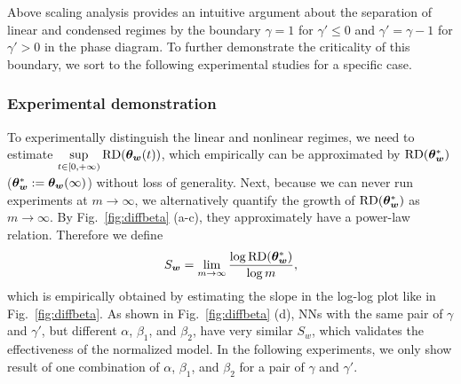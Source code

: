 \documentclass{article}
\begin{document}
Above scaling analysis provides an intuitive argument about the separation of linear and condensed regimes by the boundary $\gamma=1$ for $\gamma'\leq0$ and $\gamma'=\gamma-1$ for $\gamma'>0$ in the phase diagram. To further demonstrate the criticality of this boundary, we sort to the following experimental studies for a specific case.

\subsubsection{Experimental demonstration}
To experimentally distinguish the linear and nonlinear regimes, we need to estimate $\sup\limits_{t\in[0,+\infty)}\mathrm{RD}(\bm{\theta}_{\bm{w}}(t))$, which empirically can be approximated by $\mathrm{RD}(\bm{\theta}_{\bm{w}}^*)$ ($\bm{\theta}_{\bm{w}}^*:=\bm{\theta}_{\bm{w}}(\infty)$) without loss of generality. Next, because we can never run experiments at $m\to\infty$, we alternatively quantify the growth of $\mathrm{RD}(\bm{\theta}^*_{\bm{w}})$ as $m\to\infty$. By Fig.~\ref{fig:diffbeta} (a-c), they approximately have a power-law relation. Therefore we define
\begin{equation}
    S_{\bm{w}}=\lim_{m\to\infty}\frac{\log \mathrm{RD}(\bm{\theta}^*_{\bm{w}})}{\log m},
\end{equation}
which is empirically obtained by estimating the slope in the log-log plot like in Fig.~\ref{fig:diffbeta}. As shown in Fig.~\ref{fig:diffbeta} (d), NNs with the same pair of $\gamma$ and $\gamma'$, but different $\alpha$, $\beta_1$, and $\beta_2$, have very similar $S_{w}$, which validates the effectiveness of the normalized model. In the following experiments, we only show result of one combination of $\alpha$, $\beta_1$, and $\beta_2$ for a pair of $\gamma$ and $\gamma'$.
\end{document}
